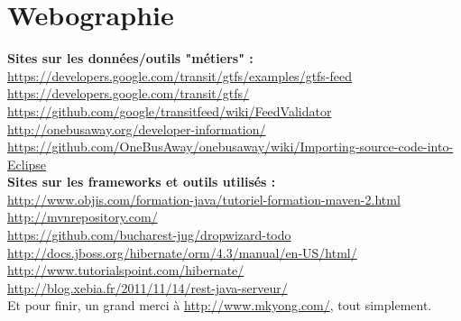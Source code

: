 \chapter*{Webographie}
\label{Bibliographie}


\textbf{Sites sur les données/outils "métiers" :}\label{OBA}\\


\url{https://developers.google.com/transit/gtfs/examples/gtfs-feed}\\

\url{https://developers.google.com/transit/gtfs/}\\

\url{https://github.com/google/transitfeed/wiki/FeedValidator}\\

\url{http://onebusaway.org/developer-information/}\\

\url{https://github.com/OneBusAway/onebusaway/wiki/Importing-source-code-into-Eclipse}\\


\textbf{Sites sur les frameworks et outils utilisés :}\\


\url{http://www.objis.com/formation-java/tutoriel-formation-maven-2.html}\\

\url{http://mvnrepository.com/}\\

\url{https://github.com/bucharest-jug/dropwizard-todo}\\

\url{http://docs.jboss.org/hibernate/orm/4.3/manual/en-US/html/}\\

\url{http://www.tutorialspoint.com/hibernate/}\\

\url{http://blog.xebia.fr/2011/11/14/rest-java-serveur/}\\


Et pour finir, un grand merci à \url{http://www.mkyong.com/}, tout simplement.
